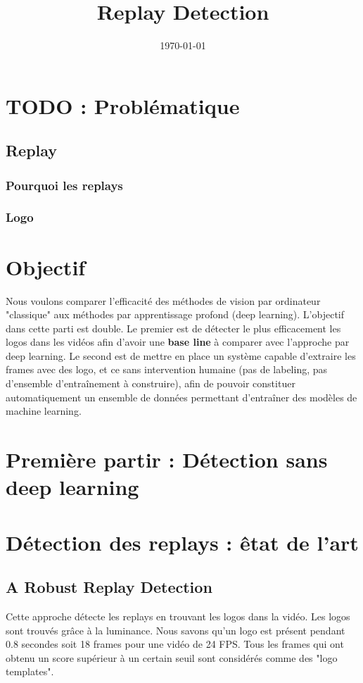 \documentclass[11pt]{article}
\date{\today}
\title{Replay Detection}
\begin{document}
\maketitle
\tableofcontents




\section{{\bfseries\sffamily TODO} : Problématique}
\label{sec-1}
\subsection{Replay}
\label{sec-1-1}
\subsubsection{Pourquoi les replays}
\label{sec-1-1-1}
\subsubsection{Logo}
\label{sec-1-1-2}

\section{Objectif}
\label{sec-2}
Nous voulons comparer l'efficacité des méthodes de vision par ordinateur "classique"
aux méthodes par apprentissage profond (deep learning).
L'objectif dans cette parti est double. Le premier est de détecter le plus efficacement les
logos dans les vidéos afin d'avoir une \textbf{base line} à comparer avec l'approche par deep learning. 
Le second est de mettre en place un système capable d'extraire les
frames avec des logo, et ce sans intervention humaine (pas de labeling, pas d'ensemble d'entraînement
à construire), afin de pouvoir constituer automatiquement un ensemble de données permettant d'entraîner
des modèles de machine learning.


\section{Première partir : Détection sans deep learning}
\label{sec-3}
\section{Détection des replays : êtat de l'art}
\label{sec-4}
\subsection{A Robust Replay Detection}
\label{sec-4-1}
Cette approche détecte les replays en trouvant les logos dans la vidéo.
Les logos sont trouvés grâce à la luminance. Nous savons qu'un logo est présent pendant 0.8 secondes soit 18 frames pour une vidéo de 24 FPS. 
Tous les frames qui ont obtenu un score supérieur à un certain seuil sont considérés comme des "logo templates".
\end{document}
